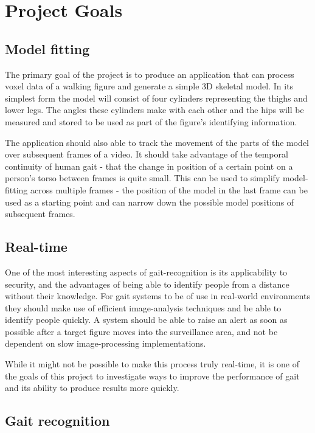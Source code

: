 \section{Project Goals}

\subsection{Model fitting}

The primary goal of the project is to produce an application that can process voxel data of a walking figure and generate a simple 3D skeletal model.
In its simplest form the model will consist of four cylinders representing the thighs and lower legs.
The angles these cylinders make with each other and the hips will be measured and stored to be used as part of the figure's identifying information.

The application should also able to track the movement of the parts of the model over subsequent frames of a video.
It should take advantage of the temporal continuity of human gait - that the change in position of a certain point on a person's torso between frames is quite small.
This can be used to simplify model-fitting across multiple frames -
the position of the model in the last frame can be used as a starting point and can narrow down the possible model positions of subsequent frames.


\subsection{Real-time}

One of the most interesting aspects of gait-recognition is its applicability to security, and the advantages of being able to identify people from a distance without their knowledge.
For gait systems to be of use in real-world environments they should make use of efficient image-analysis techniques and be able to identify people quickly.
A system should be able to raise an alert as soon as possible after a target figure moves into the surveillance area, and not be dependent on slow image-processing implementations.

While it might not be possible to make this process truly real-time, it is one of the goals of this project to investigate ways to improve the performance of gait and its ability to produce results more quickly.


\subsection{Gait recognition}

